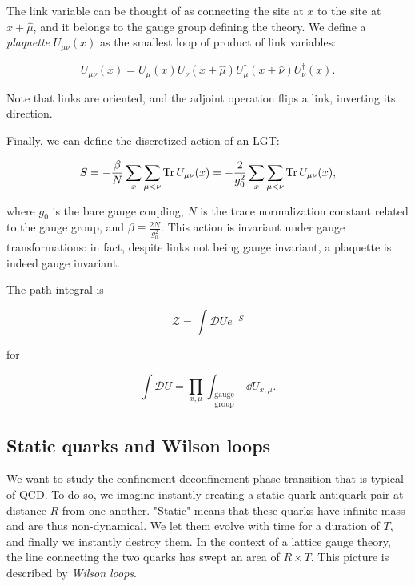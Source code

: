 \documentclass[reqno,12pt]{article}
\numberwithin{equation}{section}
\begin{document}
The link variable can be thought of as connecting the site at $x$ to the site at $x + \hat{\mu}$, and it belongs to the gauge
group defining the theory. We define a \textit{plaquette} $U_{\mu\nu}(x)$ as the smallest loop of product of link variables:

\begin{equation}
	U_{\mu\nu}(x) = U_\mu(x) U_\nu(x+\hat{\mu}) U^\dagger_\mu(x+\hat{\nu}) U^\dagger_\nu(x).
\end{equation}

Note that links are oriented, and the adjoint operation flips a link, inverting its direction.  

Finally, we can define the discretized action of an LGT:

\begin{equation} \label{eq:lgt_action}
	S = -\frac{\beta}{N} \sum_x \sum_{\mu < \nu} \Tr U_{\mu\nu}(x) = -\frac{2}{g_0^2} \sum_x \sum_{\mu < \nu} \Tr U_{\mu\nu}(x),
\end{equation}

where $g_0$ is the bare gauge coupling, $N$ is the trace normalization constant related to the gauge group, and
$\beta \equiv \frac{2N}{g_0^2}$. This action is invariant under gauge transformations: in fact, despite
links not being gauge invariant, a plaquette is indeed gauge invariant.

The path integral is

\begin{equation}
	\mathcal{Z} = \int \mathcal{D}U e^{-S}
\end{equation}

for 

\begin{equation}
	\int \mathcal{D}U = \prod_{x, \mu} \int_{\substack{\text{gauge} \\ \text{group}}} \dd{U_{x, \mu}}. 
\end{equation}

\subsection{Static quarks and Wilson loops}
We want to study the confinement-deconfinement phase transition that is typical of QCD. To do so, we imagine instantly
creating a static quark-antiquark pair at distance $R$ from one another. "Static" means that these quarks have infinite
mass and are thus non-dynamical. We let them evolve with time for a duration of $T$, 
and finally we instantly destroy them. In the context of a lattice gauge theory, the line connecting the two quarks has swept an area
of $R \times T$. This picture is described by \textit{Wilson loops}. 
\end{document}
